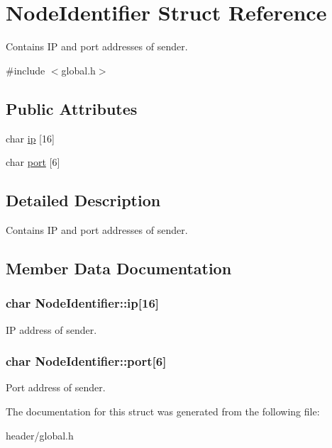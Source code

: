 \hypertarget{structNodeIdentifier}{\section{Node\-Identifier Struct Reference}
\label{structNodeIdentifier}
}


Contains I\-P and port addresses of sender.  




{\ttfamily \#include $<$global.\-h$>$}

\subsection*{Public Attributes}
\begin{DoxyCompactItemize}
\item 
char \hyperlink{structNodeIdentifier_a788390991bde5ffd3ac63bd25fe0db29}{ip} \mbox{[}16\mbox{]}
\item 
char \hyperlink{structNodeIdentifier_abd869189886d992524c2ef8dd3c6c575}{port} \mbox{[}6\mbox{]}
\end{DoxyCompactItemize}


\subsection{Detailed Description}
Contains I\-P and port addresses of sender. 

\subsection{Member Data Documentation}
\hypertarget{structNodeIdentifier_a788390991bde5ffd3ac63bd25fe0db29}{
\subsubsection[{ip}]{\setlength{\rightskip}{0pt plus 5cm}char Node\-Identifier\-::ip\mbox{[}16\mbox{]}}}\label{structNodeIdentifier_a788390991bde5ffd3ac63bd25fe0db29}
I\-P address of sender. \hypertarget{structNodeIdentifier_abd869189886d992524c2ef8dd3c6c575}{
\subsubsection[{port}]{\setlength{\rightskip}{0pt plus 5cm}char Node\-Identifier\-::port\mbox{[}6\mbox{]}}}\label{structNodeIdentifier_abd869189886d992524c2ef8dd3c6c575}
Port address of sender. 

The documentation for this struct was generated from the following file\-:\begin{DoxyCompactItemize}
\item 
header/global.\-h\end{DoxyCompactItemize}
